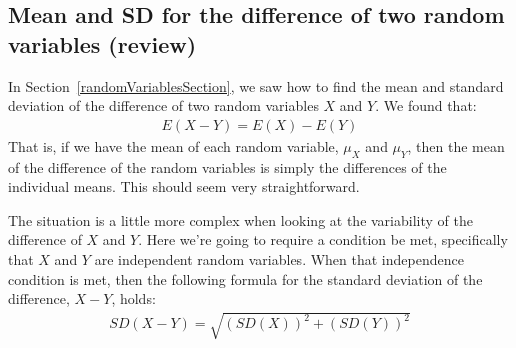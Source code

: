 

\subsection[Mean and SD for the difference of two random variables (review)]{Mean and SD for the difference of two random variables (review)}
\label{reviewdiffrv}

In Section~\ref{randomVariablesSection}, we saw how to find the
mean and standard deviation of the difference of two random
variables $X$ and $Y$.
We found that:
\begin{align*}
E(X - Y) = E(X) - E(Y)
\end{align*}
That is, if we have the mean of each random variable,
$\mu_X$ and $\mu_Y$, then the mean of the difference of the
random variables is simply the differences of the individual means.
This should seem very straightforward.

The situation is a little more complex when looking at the
variability of the difference of $X$ and $Y$.
Here we're going to require a condition be met, specifically that
$X$ and $Y$ are independent random variables.
When that independence condition is met, then the following formula
for the standard deviation of the difference, $X - Y$, holds:
\begin{align*}
SD(X - Y) =  \sqrt{(SD(X))^2 + (SD(Y))^2}
\end{align*}

